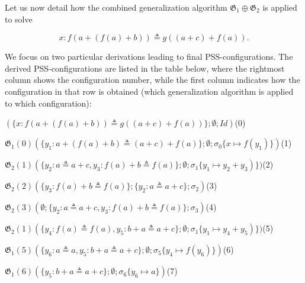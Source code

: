 \documentclass[10pt,a4paper]{amsart}
\begin{document}
 
 
Let us now detail how the combined generalization algorithm $\mathfrak{G}_{1}\oplus\mathfrak{G}_{2}$ is applied to solve\par
  
\par  \quad  \[x:f(a+(f(a)+b))\triangleq g((a+c)+f(a)).\]\quad  \quad  
  
We focus on two particular derivations leading to final PSS-configurations. The derived PSS-configurations are listed in the table below, where the rightmost column shows the configuration number, while the first column indicates how the configuration in that row is obtained (which generalization algorithm is applied to which configuration):\par
 
 
   
\par  \quad  $(\{x:f(a+(f(a)+b))\triangleq g((a+c)+f(a))\};\emptyset;\mathit{Id})$\quad  (0)\quad  
 
\par  $\mathfrak{G}_{1}(0)$\quad  $(\{y_{1}:a+(f(a)+b)\triangleq(a+c)+f(a)\};\emptyset;\sigma_{0}\{x\mapsto f(y_{1})\})$\quad  (1)\quad  
 
\par  $\mathfrak{G}_{2}(1)$\quad  $(\{y_{2}:a\triangleq a+c,y_{3}:f(a)+b\triangleq f(a)\};\emptyset;\sigma_{1}\{y_{1}\mapsto y_{2}+y_{3})\})$\quad  (2)\quad  
 
\par  $\mathfrak{G}_{2}(2)$\quad  $(\{y_{3}:f(a)+b\triangleq f(a)\};\{y_{2}:a\triangleq a+c\};\sigma_{2})$\quad  (3)\quad  
 
\par  $\mathfrak{G}_{2}(3)$\quad  $(\emptyset;\{y_{2}:a\triangleq a+c,y_{3}:f(a)+b\triangleq f(a)\};\sigma_{3})$\quad  (4)\quad  
 
\par  $\mathfrak{G}_{2}(1)$\quad  $(\{y_{4}:f(a)\triangleq f(a),y_{5}:b+a\triangleq a+c\};\emptyset;\sigma_{1}\{y_{1}\mapsto y_{4}+y_{5})\})$\quad  (5)\quad  
 
\par  $\mathfrak{G}_{1}(5)$\quad  $(\{y_{6}:a\triangleq a,y_{5}:b+a\triangleq a+c\};\emptyset;\sigma_{5}\{y_{4}\mapsto f(y_{6})\})$\quad  (6)\quad  
 
\par  $\mathfrak{G}_{1}(6)$\quad  $(\{y_{5}:b+a\triangleq a+c\};\emptyset;\sigma_{6}\{y_{6}\mapsto a\})$\quad  (7)\quad  
 
\end{document}
